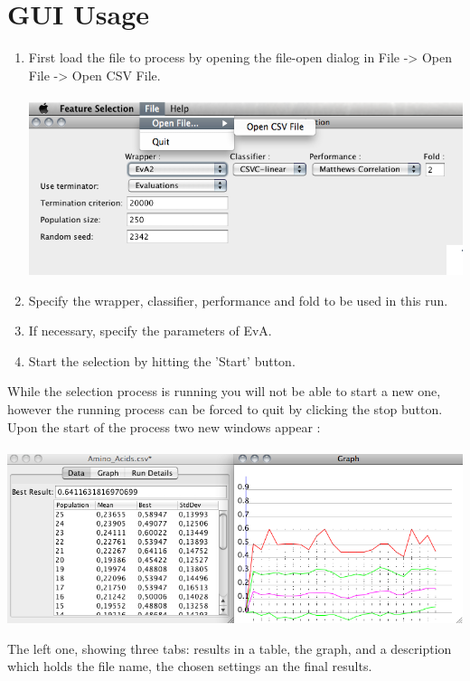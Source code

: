 \documentclass[headsepline,12pt,a4paper]{scrartcl}
\begin{document}
\section{GUI Usage}

\begin{enumerate}
\item First load the file to process by opening the file-open dialog
  in File -> Open File -> Open CSV File.\\
~\includegraphics[scale = 0.4]{open.png}
\item Specify the wrapper, classifier, performance and fold to
  be used in this run.
\item If necessary, specify the parameters of EvA.
\item Start the selection by hitting the 'Start' button. 
\end{enumerate}

While the selection process is running you will not be able to start a new
one, however the running process can be forced to quit by clicking the
stop button.\\

Upon the start of the process two new windows appear : \\

~\includegraphics[scale = 0.4]{plot.png}

The left one, showing three tabs: results in a table, the graph, and a
description which holds the file name, the chosen settings an the final results.\\
\end{document}
